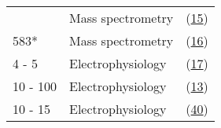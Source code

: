 \begin{longtable}[]{@{}llc@{}}
&
\begin{minipage}[t]{0.29\columnwidth}\raggedright\strut
Mass
spectrometry\strut
\end{minipage}
&
\begin{minipage}[t]{0.34\columnwidth}\centering\strut
(\protect\hyperlink{ref-schmidt2016}{15})\strut
\end{minipage}\tabularnewline
\begin{minipage}[t]{0.29\columnwidth}\raggedright\strut
583*\strut
\end{minipage}
&
\begin{minipage}[t]{0.29\columnwidth}\raggedright\strut
Mass
spectrometry\strut
\end{minipage}
&
\begin{minipage}[t]{0.34\columnwidth}\centering\strut
(\protect\hyperlink{ref-soufi2015}{16})\strut
\end{minipage}\tabularnewline
\begin{minipage}[t]{0.29\columnwidth}\raggedright\strut
4 -
5\strut
\end{minipage}
&
\begin{minipage}[t]{0.29\columnwidth}\raggedright\strut
Electrophysiology\strut
\end{minipage}
&
\begin{minipage}[t]{0.34\columnwidth}\centering\strut
(\protect\hyperlink{ref-stokes2003a}{17})\strut
\end{minipage}\tabularnewline
\begin{minipage}[t]{0.29\columnwidth}\raggedright\strut
10 -
100\strut
\end{minipage}
&
\begin{minipage}[t]{0.29\columnwidth}\raggedright\strut
Electrophysiology\strut
\end{minipage}
&
\begin{minipage}[t]{0.34\columnwidth}\centering\strut
(\protect\hyperlink{ref-booth2005}{13})\strut
\end{minipage}\tabularnewline
\begin{minipage}[t]{0.29\columnwidth}\raggedright\strut
10 -
15\strut
\end{minipage}
&
\begin{minipage}[t]{0.29\columnwidth}\raggedright\strut
Electrophysiology\strut
\end{minipage}
&
\begin{minipage}[t]{0.34\columnwidth}\centering\strut
(\protect\hyperlink{ref-blount1999}{40})\strut
\end{minipage}\tabularnewline
\bottomrule
\end{longtable}

